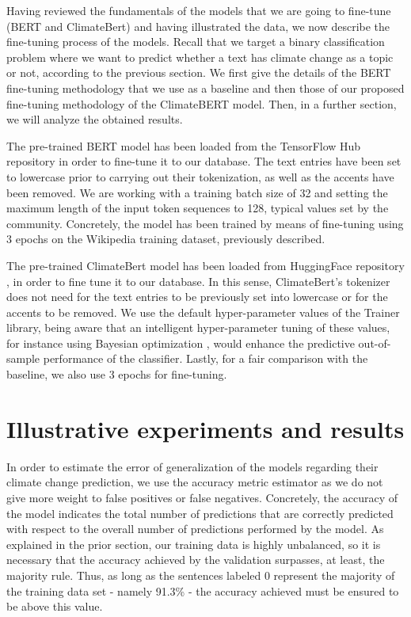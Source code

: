 \documentclass[runningheads]{llncs}
\begin{document}
Having reviewed the fundamentals of the models that we are going to fine-tune (BERT and ClimateBert) and having illustrated the data, we now describe the fine-tuning process of the models. Recall that we target a binary classification problem where we want to predict whether a text has climate change as a topic or not, according to the previous section. We first give the details of the BERT fine-tuning methodology that we use as a baseline and then those of our proposed fine-tuning methodology of the ClimateBERT model. Then, in a further section, we will analyze the obtained results. 

The pre-trained BERT model has been loaded from the TensorFlow Hub repository in order to fine-tune it to our database. The text entries have been set to lowercase prior to carrying out their tokenization, as well as the accents have been removed. We are working with a training batch size of 32 and setting the maximum length of the input token sequences to 128, typical values set by the community. Concretely, the model has been trained by means of fine-tuning using 3 epochs on the Wikipedia training dataset, previously described. 

The pre-trained ClimateBert model has been loaded from HuggingFace repository \cite{wolf2019huggingface}, in order to fine tune it to our database. In this sense, ClimateBert’s tokenizer does not need for the text entries to be previously set into lowercase or for the accents to be removed. We use the default hyper-parameter values of the Trainer library, being aware that an intelligent hyper-parameter tuning of these values, for instance using Bayesian optimization \cite{garrido2021advanced}, would enhance the predictive out-of-sample performance of the classifier. Lastly, for a fair comparison with the baseline, we also use 3 epochs for fine-tuning.  

\section{Illustrative experiments and results}

In order to estimate the error of generalization of the models regarding their climate change prediction, we use the accuracy metric estimator as we do not give more weight to false positives or false negatives. Concretely, the accuracy of the model indicates the total number of predictions that are correctly predicted with respect to the overall number of predictions performed by the model. As explained in the prior section, our training data is highly unbalanced, so it is necessary that the accuracy achieved by the validation surpasses, at least, the majority rule. Thus, as long as the sentences labeled 0 represent the majority of the training data set - namely 91.3\% - the accuracy achieved must be ensured to be above this value. 
\end{document}
